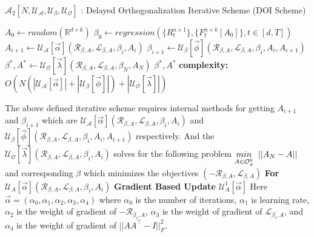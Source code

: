 \begin{algorithm}[H]
\caption{$\mathcal{A}_{2}[N,\mathcal{U_{A}},\mathcal{U_{\beta}}, \mathcal{U_{O}}]$ : Delayed Orthogonalization Iterative Scheme (DOI Scheme)}\label{lfm_orthogonal_property_iterative_scheme}
\begin{algorithmic}[1]
\State $A_{0} \gets random(\mathbb{R}^{d\times k}) $
\State $\beta_0 \gets regression(\{R^{n\times 1}_{t}\},\{F^{n\times k}_{t}[A_0]\}, t\in [d,T])$
    \State $A_{i+1} \gets  \mathcal{U_{A}}[\vec{\alpha}](\mathcal{R}_{\beta, A},\mathcal{L}_{\beta, A},\beta_i,A_i)$
    \State $\beta_{i+1} \gets \mathcal{U_{\beta}}[\vec{\phi}](\mathcal{R}_{\beta, A},\mathcal{L}_{\beta, A},\beta_{i}, A_{i}, A_{i+1})$
\EndFor
\State $\beta^{*}, A^{*} \gets \mathcal{U_{O}}[\vec{\lambda}](\mathcal{R}_{\beta, A},\mathcal{L}_{\beta, A},\beta_{N}, A_{N})$
\State \Return $\beta^{*},A^{*}$
\State \textbf{complexity: } $O(N(|\mathcal{U_{A}}[\vec{\alpha}]|+|\mathcal{U_{\beta}}[\vec{\phi}]|)+|\mathcal{U_{O}}[\vec{\lambda}]|)$
\end{algorithmic}
\end{algorithm} \hspace{0mm} \newline The above defined iterative scheme requires internal methods for getting $A_{i+1}$ and $\beta_{i+1}$ which are $\mathcal{U_{A}}[\vec{\alpha}](\mathcal{R}_{\beta, A},\mathcal{L}_{\beta, A},\beta_i,A_i)$ and $\mathcal{U_{\beta}}[\vec{\phi}](\mathcal{R}_{\beta, A},\mathcal{L}_{\beta, A},\beta_i, A_{i}, A_{i+1})$ respectively. And the $\mathcal{U_{O}}[\vec{\lambda}](\mathcal{R}_{\beta, A},\mathcal{L}_{\beta, A},\beta_i,A_i)$ solves for the following problem $\underset{A \in \mathcal{O}_d^k}{min} \hspace{2mm} ||A_{N}-A||$ and corresponding $\beta$ which minimizes the objectives $(-\mathcal{R}_{\beta, A},\mathcal{L}_{\beta, A})$ 
\newline \newline \textbf{ For $\mathcal{U}_{A}[\vec{\alpha}](\mathcal{R}_{\beta, A},\mathcal{L}_{\beta, A},\beta_i,A_i)$}
\newline \textbf{Gradient Based Update $\mathcal{U}^{1}_{A}[\vec{\alpha}]$}
\newline Here $\vec{\alpha} = (\alpha_0,\alpha_1,\alpha_2,\alpha_3,\alpha_4)$ where $\alpha_0$ is the number of iterations, $\alpha_1$ is learning rate, $\alpha_2$ is the weight of gradient of $-\mathcal{R}_{\beta_i, A}$,  $\alpha_3$ is the weight of gradient of $\mathcal{L}_{\beta_i, A}$, and  $\alpha_4$ is the weight of gradient of $||AA^\top-I||^2_F$.
